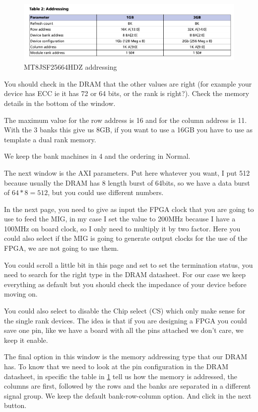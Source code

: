 \begin{figure}
    \centering
    \includegraphics[scale=0.35]{img/dram_addr.png}
    \caption{MT8JSF25664HDZ addressing}
    \label{fig:addrs}
\end{figure}


You should check in the DRAM that the other values are right (for example your device has ECC ie it has 72 or 64 bits, or the rank is right?). Check the memory details in the bottom of the window.


The maximum value for the row address is 16 and for the column address is 11. With the 3 banks this give us 8GB, if you want to use a 16GB you have to use as template a dual rank memory. 

We keep the bank machines in 4 and the ordering in Normal.


The next window is the AXI parameters. Put here whatever you want, I put 512 because usually the DRAM has 8 length burst of 64bits, so we have a data burst of $64*8=512$, but you could use different numbers.

In the next page, you need to give as input the FPGA clock that you are going to use to feed the MIG, in my case I set the value to 200MHz   because I have a 100MHz on board clock, so I only need to multiply it by two factor. 
Here you could also select if the MIG is going to generate output clocks for the use of the FPGA, we are not going to use them.


You could scroll a little bit in this page and set to set the termination status, you need to search for the right type in the DRAM datasheet. For our case we keep everything as default but you should check the impedance of your device before moving on.


You could also select to disable the Chip select (CS) which only make sense for the single rank devices. The idea is that if you are designing a FPGA you could save one pin, like we have a board with all the pins attached we don't care, we keep it enable.

The final option in this window is the memory addressing type that our DRAM has. To know that we need to look at the pin configuration in the DRAM datasheet, in specific the table in \ref{fig:addrs} tell us how the memory is addressed, the columns are first, followed by the rows and the banks are separated in a different signal group. We keep the default bank-row-column option. And click in the next button.


